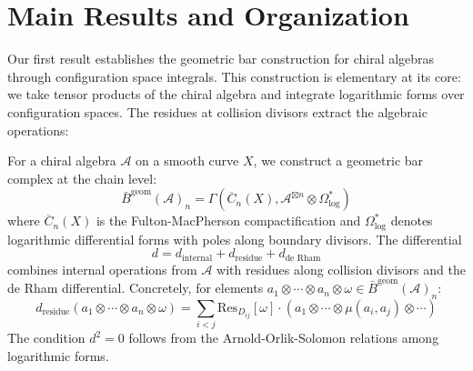 \section{Main Results and Organization}

Our first result establishes the geometric bar construction for chiral algebras through configuration space integrals. This construction is elementary at its core: we take tensor products of the chiral algebra and integrate logarithmic forms over configuration spaces. The residues at collision divisors extract the algebraic operations:

\begin{theorem}
For a chiral algebra $\mathcal{A}$ on a smooth curve $X$, we construct a geometric bar complex at the chain level:
$$\bar{B}^{\text{geom}}(\mathcal{A})_n = \Gamma\left(\overline{C}_n(X), \mathcal{A}^{\boxtimes n} \otimes \Omega^*_{\text{log}}\right)$$
where $\overline{C}_n(X)$ is the Fulton-MacPherson compactification and $\Omega^*_{\text{log}}$ denotes logarithmic differential forms with poles along boundary divisors. The differential 
$$d = d_{\text{internal}} + d_{\text{residue}} + d_{\text{de Rham}}$$
combines internal operations from $\mathcal{A}$ with residues along collision divisors and the de Rham differential. Concretely, for elements $a_1 \otimes \cdots \otimes a_n \otimes \omega \in \bar{B}^{\text{geom}}(\mathcal{A})_n$:
$$d_{\text{residue}}(a_1 \otimes \cdots \otimes a_n \otimes \omega) = \sum_{i<j} \text{Res}_{D_{ij}}[\omega] \cdot (a_1 \otimes \cdots \otimes \mu(a_i, a_j) \otimes \cdots)$$
The condition $d^2 = 0$ follows from the Arnold-Orlik-Solomon relations among logarithmic forms.
\end{theorem}

